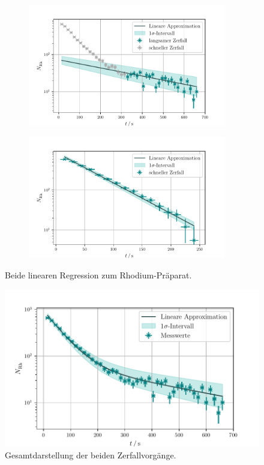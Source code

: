 \begin{figure}
    \begin{subfigure}{0.5\textwidth}
        \includegraphics[width=0.95\textwidth]{plots/Rhodium_langsam.pdf}
    \end{subfigure}
    \begin{subfigure}{0.5\textwidth}
        \includegraphics[width=0.95\textwidth]{plots/Rhodium_schnell.pdf}
    \end{subfigure}
    \caption{Beide linearen Regression zum Rhodium-Präparat.}
    \label{fig:RHlin}
\end{figure}
\begin{figure}
    \centering
    \includegraphics[width=\textwidth]{python/Rhodium_kombi.pdf}
    \caption{Gesamtdarstellung der beiden Zerfallvorgänge.}
    \label{fig:Rhodium_kombi}
\end{figure}